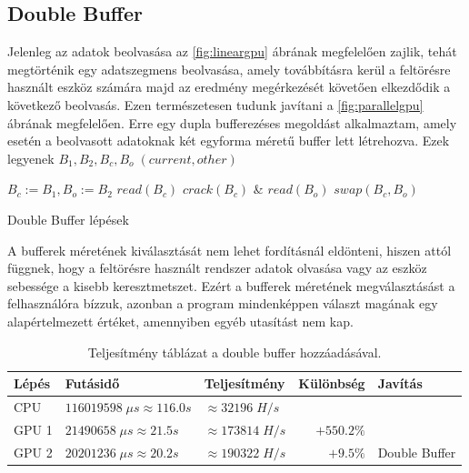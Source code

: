 \subsection{Double Buffer}



Jelenleg az adatok beolvasása az \ref{fig:lineargpu} ábrának megfelelően zajlik, tehát megtörténik egy adatszegmens beolvasása, amely továbbításra kerül a feltörésre használt eszköz számára majd az eredmény megérkezését követően elkezdődik a következő beolvasás. Ezen természetesen tudunk javítani a  \ref{fig:parallelgpu} ábrának megfelelően. Erre egy dupla bufferezéses megoldást alkalmaztam, amely esetén a beolvasott adatoknak két egyforma méretű buffer lett létrehozva. Ezek legyenek $B_1, B_2, B_c, B_o \; (current, other)$
%

\begin{algorithm}[H]
    \begin{algorithmic}[1]
    \State $ B_c := B_1, B_o := B_2 $ \;
    \State $ read(B_c) $ \;
        \State $ crack(B_c) $ \& $ read(B_o) $ \;
        \State $ swap(B_c, B_o) $\;
    \EndWhile
    \end{algorithmic}
 
 \caption{Double Buffer lépések}
\end{algorithm}

A bufferek méretének kiválasztását nem lehet fordításnál eldönteni, hiszen attól függnek, hogy a feltörésre használt rendszer adatok olvasása vagy az eszköz sebessége a kisebb keresztmetszet. Ezért a bufferek méretének megválasztásást a felhasználóra bízzuk, azonban a program mindenképpen választ magának egy alapértelmezett értéket, amennyiben egyéb utasítást nem kap. 

\begin{table}[H]
    \centering
    \begin{tabular}{l|l|l|r|l}
        \textbf{Lépés} & \textbf{Futásidő} & \textbf{Teljesítmény} & \textbf{Különbség} & \textbf{Javítás} \\
        \hline
        \hline
        
        CPU & $\num{116 019 598} \; \mu s \approx \num{116.0}s $ & $\approx \num{32 196} \; H/s$ & & \\
        \hline
                            
        GPU 1 & $\num{21 490 658} \; \mu s \approx \num{21.5}s $ & $\approx \num{173 814} \; H/s$ & $+550.2\%$ & \\
        \hline
        
        GPU 2 & $\num{20 201 236} \; \mu s \approx \num{20.2}s $ & $\approx \num{190 322} \; H/s$ & $+9.5\%$ & Double Buffer \\
        \hline
    \end{tabular}
    \caption{Teljesítmény táblázat a double buffer hozzáadásával.}
\end{table}





